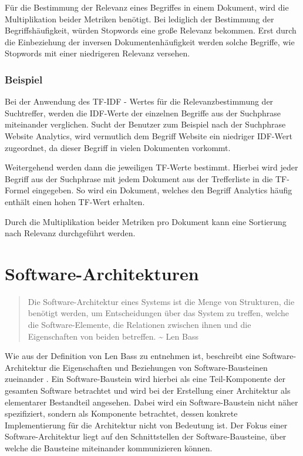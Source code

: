 Für die Bestimmung der Relevanz eines Begriffes in einem Dokument, wird die Multiplikation beider Metriken benötigt. Bei lediglich der Bestimmung der Begriffshäufigkeit, würden Stopwords eine große Relevanz bekommen. Erst durch die Einbeziehung der inversen Dokumentenhäufigkeit werden solche Begriffe, wie Stopwords mit einer niedrigeren Relevanz versehen.

\subsubsection{Beispiel}

Bei der Anwendung des TF-IDF - Wertes für die Relevanzbestimmung der Suchtreffer, werden die IDF-Werte der einzelnen Begriffe aus der Suchphrase miteinander verglichen. Sucht der Benutzer zum Beispiel nach der Suchphrase \glqq Website Analytics\grqq{}, wird vermutlich dem Begriff \glqq Website\grqq{} ein niedriger IDF-Wert zugeordnet, da dieser Begriff in vielen Dokumenten vorkommt.

Weitergehend werden dann die jeweiligen TF-Werte bestimmt. Hierbei wird jeder Begriff aus der Suchphrase mit jedem Dokument aus der Trefferliste in die TF-Formel eingegeben. So wird ein Dokument, welches den Begriff \glqq Analytics\grqq{} häufig enthält einen hohen TF-Wert erhalten.

Durch die Multiplikation beider Metriken pro Dokument kann eine Sortierung nach Relevanz durchgeführt werden.

\section{Software-Architekturen\label{sec2.2:Unterpunkt-2}}

\begin{quote}
    Die Software-Architektur eines Systems ist die Menge von Strukturen, die benötigt werden, um Entscheidungen über das System zu treffen, welche die Software-Elemente, die Relationen zwischen ihnen und die Eigenschaften von beiden betreffen. \textasciitilde{} Len Bass \cite[S. 4]{Bass.2013}
\end{quote}

Wie aus der Definition von Len Bass zu entnehmen ist, beschreibt eine Software-Architektur die Eigenschaften und Beziehungen von Software-Bausteinen zueinander \cite[S. 4]{Bass.2013}. Ein Software-Baustein wird hierbei als eine Teil-Komponente der gesamten Software betrachtet und wird bei der Erstellung einer Architektur als elementarer Bestandteil angesehen. Dabei wird ein Software-Baustein nicht näher spezifiziert, sondern als Komponente betrachtet, dessen konkrete Implementierung für die Architektur nicht von Bedeutung ist. Der Fokus einer Software-Architektur liegt auf den Schnittstellen der Software-Bausteine, über welche die Bausteine miteinander kommunizieren können.

